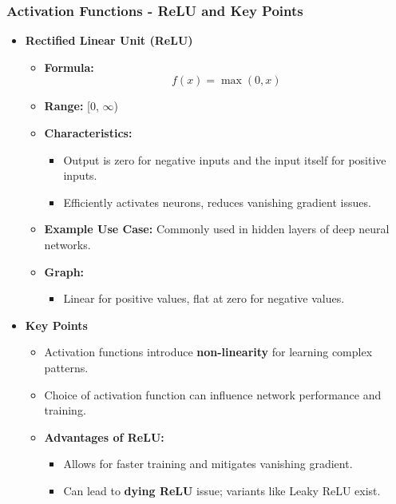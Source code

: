 \documentclass[aspectratio=169]{beamer}
\begin{document}
\begin{frame}[fragile]
    \frametitle{Activation Functions - ReLU and Key Points}
    \begin{itemize}
        \item \textbf{Rectified Linear Unit (ReLU)}
            \begin{itemize}
                \item \textbf{Formula:}
                    \begin{equation*}
                    f(x) = \max(0, x)
                    \end{equation*}
                \item \textbf{Range:} [0, $\infty$)
                \item \textbf{Characteristics:}
                    \begin{itemize}
                        \item Output is zero for negative inputs and the input itself for positive inputs.
                        \item Efficiently activates neurons, reduces vanishing gradient issues.
                    \end{itemize}
                \item \textbf{Example Use Case:} Commonly used in hidden layers of deep neural networks.
                \item \textbf{Graph:}
                    \begin{itemize}
                        \item Linear for positive values, flat at zero for negative values.
                    \end{itemize}
            \end{itemize}

        \item \textbf{Key Points}
            \begin{itemize}
                \item Activation functions introduce \textbf{non-linearity} for learning complex patterns.
                \item Choice of activation function can influence network performance and training.
                \item \textbf{Advantages of ReLU:}
                    \begin{itemize}
                        \item Allows for faster training and mitigates vanishing gradient.
                        \item Can lead to \textbf{dying ReLU} issue; variants like Leaky ReLU exist.
                    \end{itemize}
            \end{itemize}
        

\end{itemize}
\end{frame}
\end{document}
